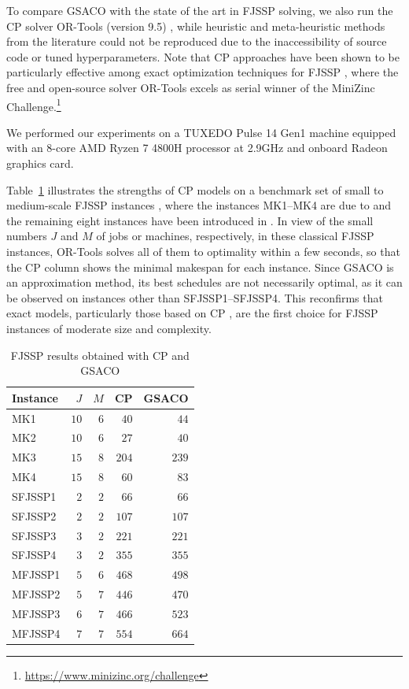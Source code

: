 \documentclass[runningheads]{llncs}
\begin{document}
To compare GSACO with the state of the art in FJSSP solving,
we also run the CP solver OR-Tools (version 9.5) \cite{pediga23a},
while heuristic and meta-heuristic methods from the literature could not
be reproduced due to the inaccessibility of source code or tuned hyperparameters.
Note that CP approaches have been shown to be particularly effective among
exact optimization techniques for FJSSP \cite{kubec16a},
where the free and open-source solver OR-Tools excels
as serial winner of the Mi\-ni\-Zinc Challenge.\footnote{\url{https://www.minizinc.org/challenge}}

We performed our experiments on a TUXEDO Pulse 14 Gen1 machine
equipped with an 8-core AMD Ryzen 7 4800H processor at 2.9GHz and onboard
Radeon graphics card.


Table~\ref{tab:benchmarkresults} illustrates the strengths of CP models on a benchmark set of
small to medium-scale FJSSP instances \cite{arnaout2014two},
where the instances MK1--MK4 are due to 
\cite{brandimarte1993routing} and the remaining eight instances
have been introduced in
\cite{fattahi2007mathematical}.
In view of the small numbers $J$ and $M$ of jobs or machines, respectively,
in these classical FJSSP instances,
OR-Tools solves all of them to optimality within a few seconds,
so that the CP column shows the minimal makespan for each instance.
Since GSACO is an approximation method, its best schedules are not
necessarily optimal, as it can be observed on instances other than
SFJSSP1--SFJSSP4.
This reconfirms that exact models,
particularly those based on CP \cite{kubec16a},
are the first choice for FJSSP instances
of moderate size and complexity.%
%
\begin{table}[t]
\caption{FJSSP results obtained with CP and GSACO}\label{tab:benchmarkresults} \centering
\begin{tabular}{lrrrr}
	\hline
	Instance & $J$  & $M$ & CP  & GSACO \\ \hline
	MK1      & $10$ & $6$ & $40$  & $44$     \\ 
	MK2      & $10$ & $6$ & $27$  & $40$     \\ 
	MK3      & $15$ & $8$ & $204$ & $239$    \\ 
	MK4      & $15$ & $8$ & $60$  & $83$     \\ 
	SFJSSP1   & $2$ & $2$ & $66$  & $66$     \\ 
	SFJSSP2   & $2$ & $2$ & $107$ & $107$    \\ 
	SFJSSP3   & $3$ & $2$ & $221$ & $221$    \\ 
	SFJSSP4   & $3$ & $2$ & $355$ & $355$    \\ 
	MFJSSP1   & $5$ & $6$ & $468$ & $498$    \\ 
	MFJSSP2   & $5$ & $7$ & $446$ & $470$    \\ 
	MFJSSP3   & $6$ & $7$ & $466$ & $523$    \\ 
	MFJSSP4   & $7$ & $7$ & $554$ & $664$    \\ 
	\hline
\end{tabular}
\end{table}
\end{document}
